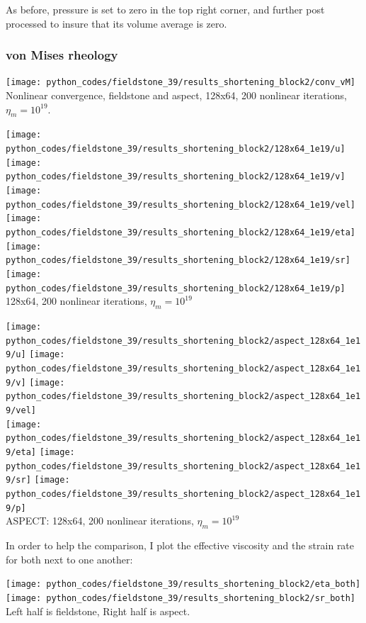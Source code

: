 As before, pressure is set to zero in the top right corner, and further post processed to insure that its volume 
average is zero.


\clearpage
\subsubsection*{von Mises rheology}

\begin{center}
\texttt{[image: python\_codes/fieldstone\_39/results\_shortening\_block2/conv\_vM]}\\
{\captionfont Nonlinear convergence, fieldstone and aspect, 128x64, 200 nonlinear iterations, $\eta_m=10^{19}$.}
\end{center}
\begin{center}
\texttt{[image: python\_codes/fieldstone\_39/results\_shortening\_block2/128x64\_1e19/u]}
\texttt{[image: python\_codes/fieldstone\_39/results\_shortening\_block2/128x64\_1e19/v]}
\texttt{[image: python\_codes/fieldstone\_39/results\_shortening\_block2/128x64\_1e19/vel]}\\
\texttt{[image: python\_codes/fieldstone\_39/results\_shortening\_block2/128x64\_1e19/eta]}
\texttt{[image: python\_codes/fieldstone\_39/results\_shortening\_block2/128x64\_1e19/sr]}
\texttt{[image: python\_codes/fieldstone\_39/results\_shortening\_block2/128x64\_1e19/p]}\\
{\captionfont 128x64, 200 nonlinear iterations, $\eta_m=10^{19}$}
\end{center}

\begin{center}
\texttt{[image: python\_codes/fieldstone\_39/results\_shortening\_block2/aspect\_128x64\_1e19/u]}
\texttt{[image: python\_codes/fieldstone\_39/results\_shortening\_block2/aspect\_128x64\_1e19/v]}
\texttt{[image: python\_codes/fieldstone\_39/results\_shortening\_block2/aspect\_128x64\_1e19/vel]}\\
\texttt{[image: python\_codes/fieldstone\_39/results\_shortening\_block2/aspect\_128x64\_1e19/eta]}
\texttt{[image: python\_codes/fieldstone\_39/results\_shortening\_block2/aspect\_128x64\_1e19/sr]}
\texttt{[image: python\_codes/fieldstone\_39/results\_shortening\_block2/aspect\_128x64\_1e19/p]}\\
{\captionfont ASPECT: 128x64, 200 nonlinear iterations, $\eta_m=10^{19}$}
\end{center}

\newpage
In order to help the comparison, I plot the effective viscosity and the strain rate for both next to one another:
\begin{center}
\texttt{[image: python\_codes/fieldstone\_39/results\_shortening\_block2/eta\_both]}
\texttt{[image: python\_codes/fieldstone\_39/results\_shortening\_block2/sr\_both]}\\
{\captionfont Left half is fieldstone, Right half is aspect.}
\end{center}


